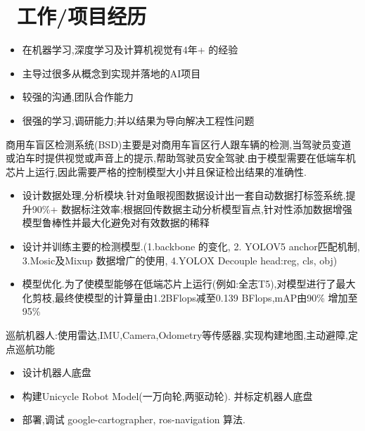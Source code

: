 \documentclass{resume}
\begin{document}


 

\section{\faUsers\ 工作/项目经历}
\role{高级算法工程师}

\begin{itemize}
  \item 在机器学习,深度学习及计算机视觉有4年+ 的经验
  \item 主导过很多从概念到实现并落地的AI项目
  \item 较强的沟通,团队合作能力
  \item 很强的学习,调研能力;并以结果为导向解决工程性问题
\end{itemize}

\begin{onehalfspacing}
商用车盲区检测系统(BSD)主要是对商用车盲区行人跟车辆的检测,当驾驶员变道或泊车时提供视觉或声音上的提示,帮助驾驶员安全驾驶.由于模型需要在低端车机芯片上运行,因此需要严格的控制模型大小并且保证检出结果的准确性.

\begin{itemize}
  \item 设计数据处理,分析模块.针对鱼眼视图数据设计出一套自动数据打标签系统,提升90\%+ 数据标注效率;根据回传数据主动分析模型盲点,针对性添加数据增强模型鲁棒性并最大化避免对有效数据的稀释
  \item 设计并训练主要的检测模型.(1.backbone 的变化, 2. YOLOV5 anchor匹配机制, 3.Mosic及Mixup 数据增广的使用, 4.YOLOX Decouple head:reg, cls, obj)
  \item 模型优化.为了使模型能够在低端芯片上运行(例如:全志T5),对模型进行了最大化剪枝,最终使模型的计算量由1.2BFlops减至0.139 BFlops,mAP由90\% 增加至 95\%
\end{itemize}
\end{onehalfspacing}


\begin{onehalfspacing}
巡航机器人:使用雷达,IMU,Camera,Odometry等传感器,实现构建地图,主动避障,定点巡航功能
\begin{itemize}
  \item 设计机器人底盘
  \item 构建Unicycle Robot Model(一万向轮,两驱动轮). 并标定机器人底盘
  \item 部署,调试 google-cartographer, ros-navigation 算法.
\end{itemize}
\end{onehalfspacing}
\end{document}
